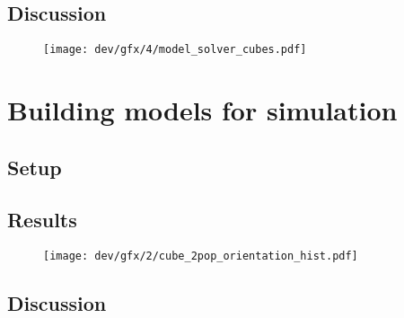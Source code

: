 \subsection{Discussion}
% 
\begin{figure}[!t]
\centering
\texttt{[image: dev/gfx/4/model\_solver\_cubes.pdf]}
\caption{}
\end{figure}
% 
\section{Building models for simulation}
% 
\subsection{Setup}
% 
\subsection{Results}
% 
\begin{figure}[!t]
\centering
\texttt{[image: dev/gfx/2/cube\_2pop\_orientation\_hist.pdf]}
\caption{}
\end{figure}
% 
\subsection{Discussion}

